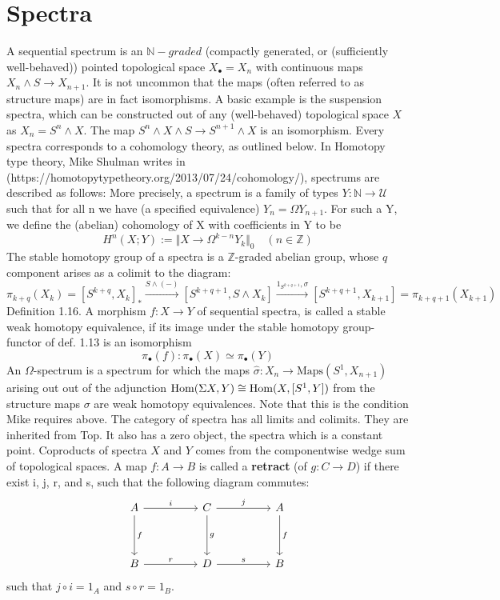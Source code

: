 \section{Spectra}
A sequential spectrum is an $\mathbb{N}-graded$ (compactly generated, or (sufficiently well-behaved)) pointed topological space $X_{\bullet} = X_n$ with continuous maps $X_n \land S \to X_{n+1}$. It is not uncommon that the maps (often referred to as structure maps) are in fact isomorphisms.
A basic example is the suspension spectra, which can be constructed out of any (well-behaved) topological space $X$ as $X_n = S^n \land X$. The map $S^n \land X \land S \to S^{n+1} \land X$ is an isomorphism.
Every spectra corresponds to a cohomology theory, as outlined below.
In Homotopy type theory, Mike Shulman writes in (https://homotopytypetheory.org/2013/07/24/cohomology/), spectrums are described as follows:
More precisely, a spectrum is a family of types $Y : \mathbb{N} \to \mathcal{U}$ such that for all n we have (a specified equivalence) $Y_n = \Omega Y_{n+1}$.
For such a Y, we define the (abelian) cohomology of X with coefficients in Y to be
\[
H^n(X;Y) := \Vert X \to \Omega^{k-n} Y_k \Vert_0 \quad (n \in \mathbb{Z})
\]
The stable homotopy group of a spectra is a $\mathbb{Z}$-graded abelian group, whose $q$ component arises as a colimit to the diagram:
\[
\pi_{k+q}(X_k) = [S^{k+q}, X_k]_* \xrightarrow{S \land (-)} [S^{k+q+1}, S \land X_{k}] \xrightarrow{1_{S^{k+q+1}}, \sigma} [S^{k+q+1}, X_{k+1}] = \pi_{k+q+1}(X_{k+1})
\]
Definition 1.16. A morphism $f: X \to Y$ of sequential spectra, is called a stable weak homotopy equivalence, if its image under the stable homotopy group-functor of def. 1.13 is an isomorphism
\[
\pi_{\bullet}(f): \pi_{\bullet}(X) \simeq \pi_{\bullet}(Y)
\]
An $\Omega$-spectrum is a spectrum for which the maps $\hat \sigma : X_n \to \text{Maps}(S^1,X_{n+1})$ arising out out of the adjunction $\operatorname{\text{Hom}}(\Sigma X, Y) \cong \operatorname{\text{Hom}}(X, [S^1, Y])$ from the structure maps $\sigma$ are weak homotopy equivalences. Note that this is the condition Mike requires above.
The category of spectra has all limits and colimits. They are inherited from Top. It also has a zero object, the spectra which is a constant point. Coproducts of spectra $X$ and $Y$ comes from the componentwise wedge sum of topological spaces.
A map $f: A \to B$ is called a \textbf{retract} (of $g : C \to D$) if there exist i, j, r, and s, such that the following diagram commutes:
\[
\ti
A \ar[d, "f"] \ar[r, "i"] & C \ar[d, "g"] \ar[r,"j"] & A \ar[d, "f"]\\
B \ar[r, "r"] & D \ar[r, "s"] & B
\kz
\]
such that $j \circ i = 1_A$ and $s \circ r = 1_B$.
